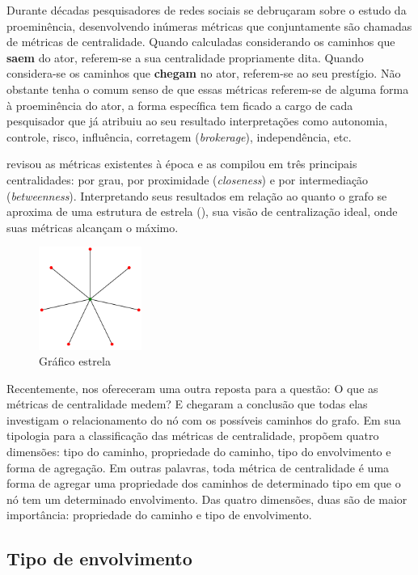 Durante décadas pesquisadores de redes sociais se debruçaram sobre o estudo da
proeminência, desenvolvendo inúmeras métricas que conjuntamente são chamadas de
métricas de centralidade. Quando calculadas considerando os caminhos que
\textbf{saem} do ator, referem-se a sua centralidade propriamente dita. Quando
considera-se os caminhos que \textbf{chegam} no ator, referem-se ao seu
prestígio. Não obstante tenha o comum senso de que essas métricas referem-se de
alguma forma à proeminência do ator, a forma específica tem ficado a cargo de
cada pesquisador que já atribuiu ao seu resultado interpretações como autonomia,
controle, risco, influência, corretagem (\emph{brokerage}), independência,
etc.

\citet{Freeman1979} revisou as métricas existentes à época e as compilou em três
principais centralidades: por grau, por proximidade (\emph{closeness}) e por
intermediação (\emph{betweenness}). Interpretando seus resultados em relação ao
quanto o grafo se aproxima de uma estrutura de estrela (),
sua visão de centralização ideal, onde suas métricas alcançam o máximo.

\begin{figure}[h!]
  \caption{Gráfico estrela}
  \label{fig:star}
  \centering
    \includegraphics[width=0.3\textwidth]{imgs/star.png}
\end{figure}

Recentemente, \citet{Borgatti2006} nos ofereceram uma outra reposta para a
questão: O que as métricas de centralidade medem? E chegaram a conclusão que
todas elas investigam o relacionamento do nó com os possíveis caminhos do grafo.
Em sua tipologia para a classificação das métricas de centralidade, propõem
quatro dimensões: tipo do caminho, propriedade do caminho, tipo do envolvimento e
forma de agregação. Em outras palavras, toda métrica de centralidade é uma forma
de agregar uma propriedade dos caminhos de determinado tipo em que o nó tem um
determinado envolvimento. Das quatro dimensões, duas são de maior importância:
propriedade do caminho e tipo de envolvimento.

\subsection{Tipo de envolvimento} 

